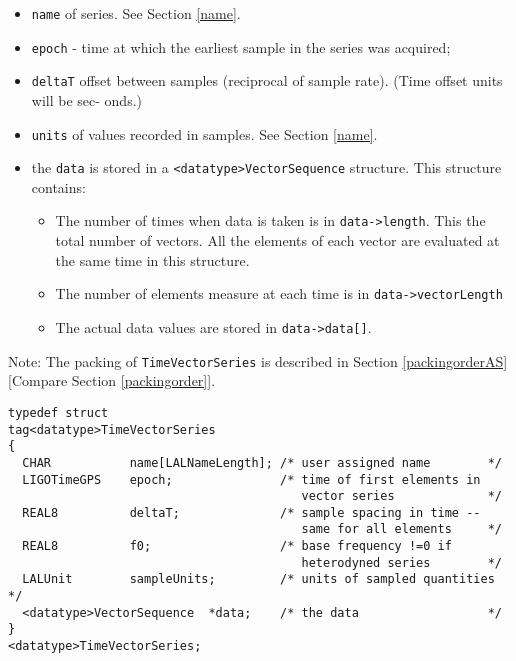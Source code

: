\documentclass[]{ligodcc}
\begin{document}
\begin{itemize}
\vspace{-0.15in}
\item
{\tt name} of series. See Section \ref{name}.
\vspace{-0.15in}
\item
{\tt epoch} - time at which the earliest sample in the series was acquired;
\vspace{-0.15in}
\item
{\tt deltaT} offset between samples (reciprocal of sample rate).  (Time
offset units will be sec- onds.)
\vspace{-0.15in}
\item
{\tt units} of values recorded in samples. See Section \ref{name}.
\vspace{-0.15in}
\item
the {\tt data} is stored in a {\tt <datatype>VectorSequence}  structure.
This structure contains:
\begin{itemize}
\vspace{-0.15in}
\item
The number of times when data is taken is in {\tt data->length}. This the
total number of vectors. All the elements of each vector are evaluated at the
same time in this structure.
\item
The number of elements measure at each time is in {\tt data->vectorLength}
\item
The  actual data  values are stored in {\tt data->data[]}.
\end{itemize}
\end{itemize}

Note: The packing of {\tt TimeVectorSeries} is described in Section
\ref{packingorderAS} [Compare Section \ref{packingorder}].

{\footnotesize
\begin{verbatim}
typedef struct
tag<datatype>TimeVectorSeries
{
  CHAR           name[LALNameLength]; /* user assigned name        */
  LIGOTimeGPS    epoch;               /* time of first elements in
                                         vector series             */
  REAL8          deltaT;              /* sample spacing in time --
                                         same for all elements     */
  REAL8          f0;                  /* base frequency !=0 if
                                         heterodyned series        */
  LALUnit        sampleUnits;         /* units of sampled quantities */
  <datatype>VectorSequence  *data;    /* the data                  */
}
<datatype>TimeVectorSeries;
\end{verbatim}}
\end{document}
